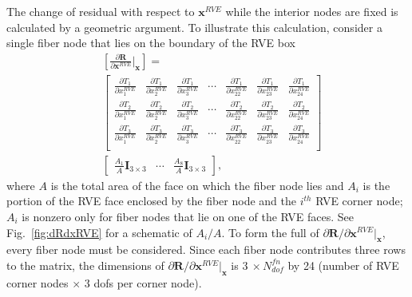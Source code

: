 \documentclass[12pt,aps,pre]{revtex4}
\begin{document}
The change of residual with respect to $\pmb{x}^{RVE}$ while the interior nodes are fixed is calculated by a geometric argument. To illustrate this calculation, consider a single fiber node that lies on the boundary of the RVE box 
%
\begin{align}
&\left [\frac{\partial \pmb{R}}{\partial \pmb{x}^{RVE}}\bigg |_{\pmb{x}}\right] = \nonumber\\
%
&\begin{bmatrix} 
\frac{\partial T_1}{\partial x_1^{RVE}} & \frac{\partial T_1}{\partial x_2^{RVE}} & \frac{\partial T_1}{\partial x_3^{RVE}} & \cdots & \frac{\partial T_1}{\partial x_{22}^{RVE}} & \frac{\partial T_1}{\partial x_{23}^{RVE}} & \frac{\partial T_1}{\partial x_{24}^{RVE}} \\
%
\frac{\partial T_2}{\partial x_1^{RVE}} & \frac{\partial T_2}{\partial x_2^{RVE}} & \frac{\partial T_2}{\partial x_3^{RVE}} & \cdots & \frac{\partial T_2}{\partial x_{22}^{RVE}} & \frac{\partial T_2}{\partial x_{23}^{RVE}} & \frac{\partial T_2}{\partial x_{24}^{RVE}} \\
%
\frac{\partial T_3}{\partial x_1^{RVE}} & \frac{\partial T_3}{\partial x_2^{RVE}} & \frac{\partial T_3}{\partial x_3^{RVE}} & \cdots & \frac{\partial T_3}{\partial x_{22}^{RVE}} & \frac{\partial T_3}{\partial x_{23}^{RVE}} & \frac{\partial T_3}{\partial x_{24}^{RVE}} \\
\end{bmatrix} \nonumber\\
%
& \begin{bmatrix}
\frac{A_1}{A}\pmb{I}_{3\times3} & \cdots & \frac{A_8}{A}\pmb{I}_{3\times3}
\end{bmatrix},
\label{eq:dRdxRVE_1node}
\end{align}
%
where $A$ is the total area of the face on which the fiber node lies and $A_i$ is the portion of the RVE face enclosed by the fiber node and the $i^{th}$ RVE corner node; $A_i$ is nonzero only for fiber nodes that lie on one of the RVE faces. See Fig.\ \ref{fig:dRdxRVE} for a schematic of $A_i/A$. To form the full of $\partial \pmb{R}/\partial \pmb{x}^{RVE} |_{\pmb{x}}$, every fiber node must be considered. Since each fiber node contributes three rows to the matrix, the dimensions of $\partial \pmb{R}/\partial \pmb{x}^{RVE} |_{\pmb{x}}$ is $3 \ \times N_{dof}^{fn}$ by 24 (number of RVE corner nodes $\times$ 3 dofs per corner node).
%
\end{document}

